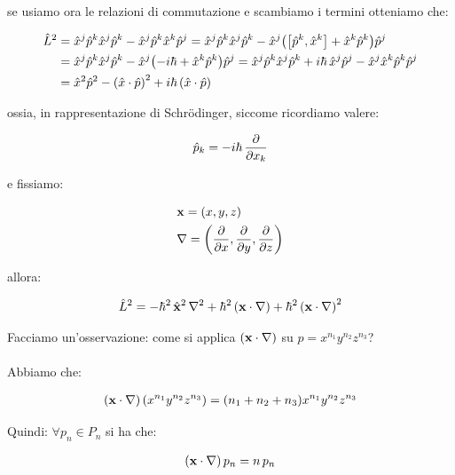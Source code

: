 	se usiamo ora le relazioni di commutazione e scambiamo i termini otteniamo che:
	
\begin{align*}
	\hat{L}^2 & = \hat{x}^j \hat{p}^k \hat{x}^j \hat{p}^k - \hat{x}^j \hat{p}^k \hat{x}^k \hat{p}^j =  \hat{x}^j \hat{p}^k \hat{x}^j \hat{p}^k - \hat{x}^j \qty( \qty[\hat{p}^k, \hat{x}^k] + \hat{x}^k \hat{p}^k ) \hat{p}^j \\
	& = \hat{x}^j \hat{p}^k \hat{x}^j \hat{p}^k - \hat{x}^j \qty( - i \hbar + \hat{x}^k \hat{p}^k ) \hat{p}^j = \hat{x}^j \hat{p}^k \hat{x}^j \hat{p}^k + i \hbar \, \hat{x}^j \hat{p}^j - \hat{x}^j  \hat{x}^k \hat{p}^k \hat{p}^j \\
	& = \hat{x}^2 \hat{p}^2 - \qty(\hat{x} \cdot \hat{p})^2 + i \hbar \, \qty(\hat{x} \cdot \hat{p})
\end{align*}

	ossia, in rappresentazione di Schr\"odinger, siccome ricordiamo valere:
	
\begin{align*}
	\hat{p}_k = - i \hbar \, \pdv{}{x_k}
\end{align*}

	e fissiamo:
	
\begin{align*}
	& \vb{x} = \qty(x, y, z) \\
	& \nabla = \qty(\pdv{}{x}, \pdv{}{y}, \pdv{}{z})
\end{align*}

	allora:
	
\begin{align*}
	\hat{L}^2 = - \hbar^2 \, \hat{\vb{x}}^2 \, \nabla^2 + \hbar^2 \, \qty(\vb{x} \cdot \nabla) + \hbar^2 \, \qty(\vb{x} \cdot \nabla)^2
\end{align*}
	
	Facciamo un'osservazione: come si applica $\qty(\vb{x} \cdot \nabla)$ su $p = x^{n_1} y^{n_2} z^{n_3}$? 
	\\
	\\
	Abbiamo che:

\begin{align*}
	\qty(\vb{x} \cdot \nabla) \, \qty(x^{n_1} y^{n_2} z^{n_3}) = \qty(n_1 + n_2 + n_3) x^{n_1} y^{n_2} z^{n_3}
\end{align*}

	Quindi: $\forall p_n \in P_n$ si ha che:
	
\begin{align*}
	\qty(\vb{x} \cdot \nabla)\, p_n = n \, p_n
\end{align*}

